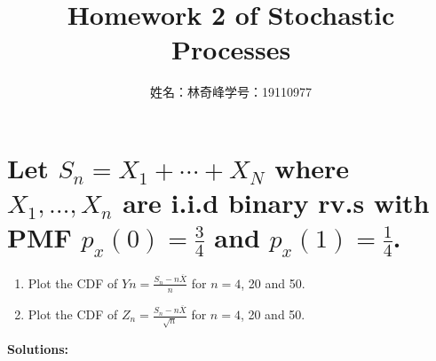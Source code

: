 \documentclass[UTF8]{article}
\begin{document}
\title{Homework 2 of Stochastic Processes}
\author{姓名：林奇峰\qquad 学号：19110977}
\maketitle

\section{Let $S_n=X_1+\cdots+X_N$ where $X_1,\dots,X_n$ are i.i.d binary rv.s with PMF $p_x(0) = \frac{3}{4}$ and $p_x(1)=\frac{1}{4}$.}
\begin{enumerate}
    \item Plot the CDF of $Yn=\frac{S_n-n\overline{X}}{n}$ for $n=4$, 20 and 50.
    \item Plot the CDF of $Z_n=\frac{S_n-n\overline{X}}{\sqrt{n}}$ for $n=4$, 20 and 50.
\end{enumerate}

\textbf{Solutions:}
\end{document}
